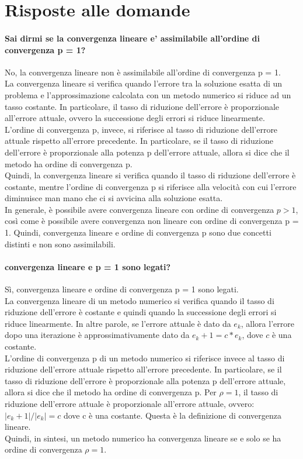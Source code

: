 \section{Risposte alle domande}
\paragraph{Sai dirmi se la convergenza lineare e' assimilabile all'ordine di convergenza p = 1?}
No, la convergenza lineare non è assimilabile all'ordine di convergenza p = 1.\\
La convergenza lineare si verifica quando l'errore tra la soluzione esatta di un problema e l'approssimazione calcolata con un metodo numerico si riduce ad un tasso costante. In particolare, il tasso di riduzione dell'errore è proporzionale all'errore attuale, ovvero la successione degli errori si riduce linearmente.\\
L'ordine di convergenza p, invece, si riferisce al tasso di riduzione dell'errore attuale rispetto all'errore precedente. In particolare, se il tasso di riduzione dell'errore è proporzionale alla potenza p dell'errore attuale, allora si dice che il metodo ha ordine di convergenza p.\\
Quindi, la convergenza lineare si verifica quando il tasso di riduzione dell'errore è costante, mentre l'ordine di convergenza p si riferisce alla velocità con cui l'errore diminuisce man mano che ci si avvicina alla soluzione esatta.\\
In generale, è possibile avere convergenza lineare con ordine di convergenza $p>1$, così come è possibile avere convergenza non lineare con ordine di convergenza p = 1. Quindi, convergenza lineare e ordine di convergenza p sono due concetti distinti e non sono assimilabili.

\paragraph{convergenza lineare e p = 1 sono legati?}
Sì, convergenza lineare e ordine di convergenza p = 1 sono legati.\\
La convergenza lineare di un metodo numerico si verifica quando il tasso di riduzione dell'errore è costante e quindi quando la successione degli errori si riduce linearmente. In altre parole, se l'errore attuale è dato da $e_k$, allora l'errore dopo una iterazione è approssimativamente dato da $e_k+1 = c * e_k$, dove $c$ è una costante.\\
L'ordine di convergenza p di un metodo numerico si riferisce invece al tasso di riduzione dell'errore attuale rispetto all'errore precedente. In particolare, se il tasso di riduzione dell'errore è proporzionale alla potenza p dell'errore attuale, allora si dice che il metodo ha ordine di convergenza p. Per $\rho=1$, il tasso di riduzione dell'errore attuale è proporzionale all'errore attuale, ovvero:
$|e_k+1| / |e_k| = c$
dove c è una costante. Questa è la definizione di convergenza lineare.\\
Quindi, in sintesi, un metodo numerico ha convergenza lineare se e solo se ha ordine di convergenza $\rho=1$.

